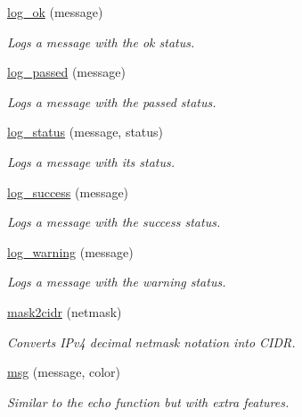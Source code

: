 \begin{DoxyCompactItemize}
\hyperlink{group__log_ga7568aef6b2176c077d4feb5c85ab1444}{log\+\_\+ok} (message)
\begin{DoxyCompactList}\small\item\em Logs a message with the \textquotesingle{}ok\textquotesingle{} status. \end{DoxyCompactList}\item 
\hyperlink{group__log_ga074798b609f0b5076100e00dc9ca8321}{log\+\_\+passed} (message)
\begin{DoxyCompactList}\small\item\em Logs a message with the \textquotesingle{}passed\textquotesingle{} status. \end{DoxyCompactList}\item 
\hyperlink{group__log_ga2a12f6f9378f17256075a29a706a58f5}{log\+\_\+status} (message, status)
\begin{DoxyCompactList}\small\item\em Logs a message with its status. \end{DoxyCompactList}\item 
\hyperlink{group__log_gab87ab941c025cd7a51097e6a4d9a2880}{log\+\_\+success} (message)
\begin{DoxyCompactList}\small\item\em Logs a message with the \textquotesingle{}success\textquotesingle{} status. \end{DoxyCompactList}\item 
\hyperlink{group__log_gab5a7732343823ce546c484692d6812ff}{log\+\_\+warning} (message)
\begin{DoxyCompactList}\small\item\em Logs a message with the \textquotesingle{}warning\textquotesingle{} status. \end{DoxyCompactList}\item 
\hyperlink{group__network_ga807b7f569c898e32f4ce207a8209a584}{mask2cidr} (netmask)
\begin{DoxyCompactList}\small\item\em Converts I\+Pv4 decimal netmask notation into C\+I\+DR. \end{DoxyCompactList}\item 
\hyperlink{group__message_ga0a802cfb26922315f8503676672fcea9}{msg} (message, color)
\begin{DoxyCompactList}\small\item\em Similar to the \textquotesingle{}echo\textquotesingle{} function but with extra features. \end{DoxyCompactList}\item 

\end{DoxyCompactItemize}
